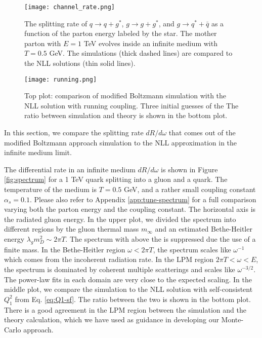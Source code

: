 \begin{figure}
\texttt{[image: channel\_rate.png]}
\caption{The splitting rate of $q\rightarrow q+g^*$, $g\rightarrow g+g^*$, and $g\rightarrow q^* + \bar{q}$ as a function of the parton energy labeled by the star. The mother parton with $E=1$ TeV evolves inside an infinite medium with $T=0.5$ GeV. The simulations (thick dashed lines) are compared to the NLL solutions (thin solid lines).}
\label{fig:channel_rate}
\end{figure}

\begin{figure}
\texttt{[image: running.png]}
\caption{Top plot: comparison of modified Boltzmann simulation with the NLL solution  with running coupling.
Three initial guesses of the 
The ratio between simulation and theory is shown in the bottom plot.}
\label{fig:running}
\end{figure}

In this section, we compare the splitting rate $dR/d\omega$ that comes out of the modified Boltzmann approach simulation to the NLL approximation in the infinite medium limit.

The differential rate in an infinite medium $dR/d\omega$ is shown in Figure \ref{fig:spectrum} for a 1 TeV quark splitting into a gluon and a quark.
The temperature of the medium is $T=0.5$ GeV, and a rather small coupling constant $\alpha_s = 0.1$.
Please also refer to Appendix \ref{app:tune-spectrum} for a full comparison varying both the parton energy and the coupling constant.
The horizontal axis is the radiated gluon energy.
In the upper plot, we divided the spectrum into different regions by the gluon thermal mass $m_\infty$ and an estimated Bethe-Heitler energy $\lambda_g m_D^2 \sim 2\pi T$.
The spectrum with above the is suppressed due the use of a finite mass.
In the Bethe-Heitler region $\omega < 2\pi T$, the spectrum scales like $\omega^{-1}$ which comes from the incoherent radiation rate.
In the LPM region $2\pi T < \omega < E$, the spectrum is dominated by coherent multiple scatterings and scales like $\omega^{-3/2}$.
The power-law fits in each domain are very close to the expected scaling.
In the middle plot, we compare the simulation to the NLL solution with self-consistent $Q_1^2$ from Eq. \ref{eq:Q1-sf}. 
The ratio between the two is shown in the bottom plot.
There is a good agreement in the LPM region between the simulation and the theory calculation, which we have used as guidance in developing our Monte-Carlo approach.

